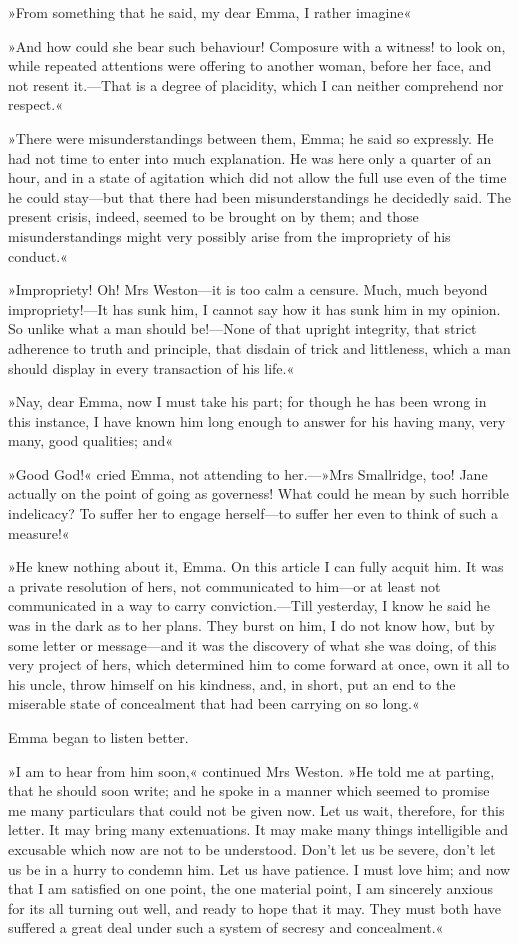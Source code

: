 »From something that he said, my dear Emma, I rather imagine\longdash«

»And how could she bear such behaviour! Composure with a witness! to look on, while repeated attentions were offering to another woman, before her face, and not resent it.—That is a degree of placidity, which I can neither comprehend nor respect.«

»There were misunderstandings between them, Emma; he said so expressly. He had not time to enter into much explanation. He was here only a quarter of an hour, and in a state of agitation which did not allow the full use even of the time he could stay—but that there had been misunderstandings he decidedly said. The present crisis, indeed, seemed to be brought on by them; and those misunderstandings might very possibly arise from the impropriety of his conduct.«

»Impropriety! Oh! Mrs Weston—it is too calm a censure. Much, much beyond impropriety!—It has sunk him, I cannot say how it has sunk him in my opinion. So unlike what a man should be!—None of that upright integrity, that strict adherence to truth and principle, that disdain of trick and littleness, which a man should display in every transaction of his life.«

»Nay, dear Emma, now I must take his part; for though he has been wrong in this instance, I have known him long enough to answer for his having many, very many, good qualities; and\longdash«

»Good God!« cried Emma, not attending to her.—»Mrs Smallridge, too! Jane actually on the point of going as governess! What could he mean by such horrible indelicacy? To suffer her to engage herself—to suffer her even to think of such a measure!«

»He knew nothing about it, Emma. On this article I can fully acquit him. It was a private resolution of hers, not communicated to him—or at least not communicated in a way to carry conviction.—Till yesterday, I know he said he was in the dark as to her plans. They burst on him, I do not know how, but by some letter or message—and it was the discovery of what she was doing, of this very project of hers, which determined him to come forward at once, own it all to his uncle, throw himself on his kindness, and, in short, put an end to the miserable state of concealment that had been carrying on so long.«

Emma began to listen better.

»I am to hear from him soon,« continued Mrs Weston. »He told me at parting, that he should soon write; and he spoke in a manner which seemed to promise me many particulars that could not be given now. Let us wait, therefore, for this letter. It may bring many extenuations. It may make many things intelligible and excusable which now are not to be understood. Don't let us be severe, don't let us be in a hurry to condemn him. Let us have patience. I must love him; and now that I am satisfied on one point, the one material point, I am sincerely anxious for its all turning out well, and ready to hope that it may. They must both have suffered a great deal under such a system of secresy and concealment.«

